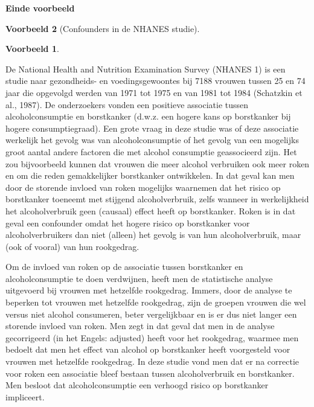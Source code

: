 \documentclass[
  12pt,dutch,coursenotes]{book}
\theoremstyle{definition}
\theoremstyle{definition}
\newtheorem{example}{Voorbeeld}[chapter]
\theoremstyle{definition}
\theoremstyle{remark}
\begin{document}
\textbf{Einde voorbeeld}

\begin{example}[Confounders in de NHANES studie]
\begin{example}

\protect\hypertarget{exm:unnamed-chunk-83}{}{\label{exm:unnamed-chunk-83} \iffalse (Confounders in de NHANES studie) \fi{} }

\end{example}
\end{example}

De National Health and Nutrition Examination Survey
(NHANES 1) is een studie naar gezondheids- en voedingsgewoontes bij 7188
vrouwen tussen 25 en 74 jaar die opgevolgd werden van 1971 tot 1975 en van
1981 tot 1984 (Schatzkin et al., 1987). De onderzoekers vonden een positieve
associatie tussen alcoholconsumptie en borstkanker (d.w.z. een hogere kans
op borstkanker bij hogere consumptiegraad). Een grote vraag in deze studie
was of deze associatie werkelijk het gevolg was van alcoholconsumptie of het
gevolg van een mogelijks groot aantal andere factoren die met alcohol
consumptie geassocieerd zijn. Het zou bijvoorbeeld kunnen dat vrouwen die
meer alcohol verbruiken ook meer roken en om die reden gemakkelijker
borstkanker ontwikkelen. In dat geval kan men door de storende invloed van
roken mogelijks waarnemen dat het risico op borstkanker toeneemt met
stijgend alcoholverbruik, zelfs wanneer in werkelijkheid het alcoholverbruik
geen (causaal) effect heeft op borstkanker. Roken is in dat geval een
confounder omdat het hogere risico op borstkanker voor alcoholverbruikers
dan niet (alleen) het gevolg is van hun alcoholverbruik, maar (ook of
vooral) van hun rookgedrag.

Om de invloed van roken op de associatie tussen borstkanker en
alcoholconsumptie te doen verdwijnen, heeft men de statistische analyse
uitgevoerd bij vrouwen met hetzelfde rookgedrag. Immers, door de analyse te
beperken tot vrouwen met hetzelfde rookgedrag, zijn de groepen vrouwen die
wel versus niet alcohol consumeren, beter vergelijkbaar en is er dus niet
langer een storende invloed van roken. Men zegt in dat geval dat men in de
analyse gecorrigeerd (in het Engels: adjusted) heeft voor het
rookgedrag, waarmee men bedoelt dat men het effect van alcohol op
borstkanker heeft voorgesteld voor vrouwen met hetzelfde rookgedrag. In deze
studie vond men dat er na correctie voor roken een associatie bleef bestaan
tussen alcoholverbruik en borstkanker. Men besloot dat alcoholconsumptie een
verhoogd risico op borstkanker impliceert.
\end{document}
